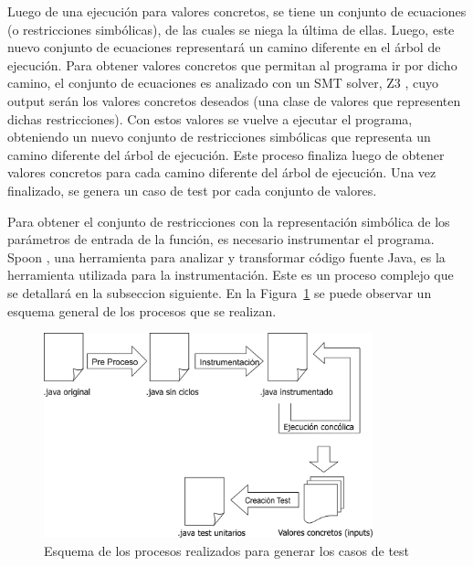 \documentclass{llncs}
\begin{document}
Luego de una ejecución para valores concretos, se tiene un conjunto de ecuaciones (o restricciones simbólicas), de las cuales se niega la última de ellas.
Luego, este nuevo conjunto de ecuaciones representará un camino diferente en el árbol de ejecución.
Para obtener valores concretos que permitan al programa ir por dicho camino, el conjunto de ecuaciones es analizado
con un SMT solver, Z3 \cite{z3solver}, cuyo output serán los valores concretos deseados (una clase de valores que representen dichas restricciones). Con estos valores se
vuelve a ejecutar el programa, obteniendo un nuevo conjunto de restricciones simbólicas que representa un camino diferente del árbol de ejecución. Este proceso finaliza luego
de obtener valores concretos para cada camino diferente del árbol de ejecución. Una vez finalizado, se genera un caso de test por cada conjunto de valores.

Para obtener el conjunto de restricciones con la representación simbólica de los parámetros de entrada de la función, es necesario instrumentar el programa.
Spoon \cite{spoon}, una herramienta para analizar y transformar código fuente Java, es la herramienta utilizada para la instrumentación.
Este es un proceso complejo que se detallará en la subseccion siguiente.
En la Figura~\ref{fig:procesosRealizados} se puede observar un esquema general de los procesos que se realizan.

\begin{figure}
\centering
\includegraphics[width=0.85\textwidth]{procesosRealizados}
\caption{Esquema de los procesos realizados para generar los casos de test}
\label{fig:procesosRealizados}
\end{figure}

\end{document}
